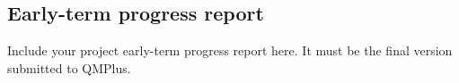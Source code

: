\subsection*{Early-term progress report}

Include your project early-term progress report here. It must be the final version submitted to QMPlus.%



% 